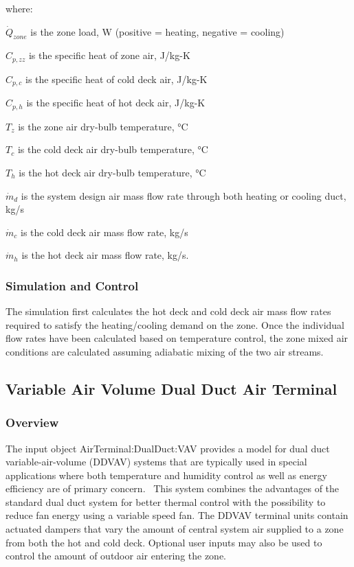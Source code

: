 where:

\(\dot Q_{zone}\) is the zone load, W (positive = heating, negative = cooling)

\(C_{p,zz}\) is the specific heat of zone air, J/kg-K

\(C_{p,c}\) is the specific heat of cold deck air, J/kg-K

\(C_{p,h}\) is the specific heat of hot deck air, J/kg-K

\({T_z}\) is the zone air dry-bulb temperature, °C

\({T_c}\) is the cold deck air dry-bulb temperature, °C

\({T_h}\) is the hot deck air dry-bulb temperature, °C

\({\dot m_d}\) is the system design air mass flow rate through both heating or cooling duct, kg/s

\({\dot m_c}\) is the cold deck air mass flow rate, kg/s

\({\dot m_h}\) is the hot deck air mass flow rate, kg/s.

\subsubsection{Simulation and Control}\label{simulation-and-control-5}

The simulation first calculates the hot deck and cold deck air mass flow rates required to satisfy the heating/cooling demand on the zone. Once the individual flow rates have been calculated based on temperature control, the zone mixed air conditions are calculated assuming adiabatic mixing of the two air streams.

\subsection{Variable Air Volume Dual Duct Air Terminal}\label{variable-air-volume-dual-duct-air-terminal}

\subsubsection{Overview}\label{overview-4-000}

The input object AirTerminal:DualDuct:VAV provides a model for dual duct variable-air-volume (DDVAV) systems that are typically used in special applications where both temperature and humidity control as well as energy efficiency are of primary concern.~ This system combines the advantages of the standard dual duct system for better thermal control with the possibility to reduce fan energy using a variable speed fan. The DDVAV terminal units contain actuated dampers that vary the amount of central system air supplied to a zone from both the hot and cold deck. Optional user inputs may also be used to control the amount of outdoor air entering the zone.

